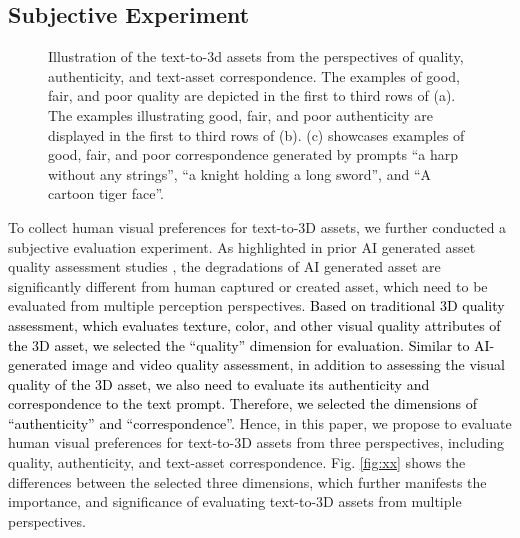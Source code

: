 \subsection{Subjective Experiment}
\begin{figure}[!t]
    \centering
                

    \caption{Illustration of the text-to-3d assets from the perspectives of quality, authenticity, and text-asset correspondence. The examples of good, fair, and poor quality are depicted in the first to third rows of (a). The examples illustrating good, fair, and poor authenticity are displayed in the first to third rows of (b). (c) showcases examples of good, fair, and poor correspondence generated by prompts ``a harp without any strings'', ``a knight holding a long sword'', and ``A cartoon tiger face''. }
    \label{fig:ap}
    \vspace{-0.4cm}
\end{figure}
To collect human visual preferences for text-to-3D assets, we further conducted a subjective evaluation experiment. As highlighted in prior AI generated asset quality assessment studies \cite{wang2023aigciqa2023, yang2024aigcoiqa2024}, the degradations of AI generated asset are significantly different from human captured or created asset, which need to be evaluated from multiple perception perspectives. \textcolor{black}{Based on traditional 3D quality assessment, which evaluates texture, color, and other visual quality attributes of the 3D asset, we selected the ``quality'' dimension for evaluation. Similar to AI-generated image and video quality assessment, in addition to assessing the visual quality of the 3D asset, we also need to evaluate its authenticity and correspondence to the text prompt. Therefore, we selected the dimensions of ``authenticity'' and ``correspondence''.} Hence, in this paper, we propose to evaluate human visual preferences for text-to-3D assets from three perspectives, including quality, authenticity, and text-asset correspondence. Fig. \ref{fig:xx} shows the differences between the selected three dimensions, which further manifests the importance, and significance of evaluating text-to-3D assets from multiple perspectives.
